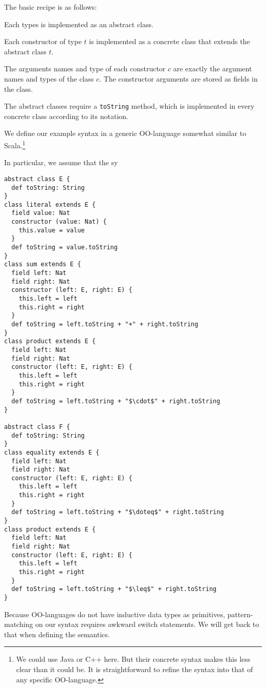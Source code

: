 The basic recipe is as follows:
\begin{compactitem}
\item Each types is implemented as an abstract class.
\item Each constructor of type $t$ is implemented as a concrete class that extends the abstract class $t$.
\item The arguments names and type of each constructor $c$ are exactly the argument names and types of the class $c$.
The constructor arguments are stored as fields in the class.
\item The abstract classes require a \texttt{toString} method, which is implemented in every concrete class according to its notation.
\end{compactitem}


\begin{example}
We define our example syntax in a generic OO-language somewhat similar to Scala.\footnote{We could use Java or C++ here. But their concrete syntax makes this less clear than it could be. It is straightforward to refine the syntax into that of any specific OO-language.}

In particular, we assume that the sy

\begin{lstlisting}
abstract class E {
  def toString: String
}
class literal extends E {
  field value: Nat
  constructor (value: Nat) {
    this.value = value
  }
  def toString = value.toString
}
class sum extends E {
  field left: Nat
  field right: Nat
  constructor (left: E, right: E) {
    this.left = left
    this.right = right
  }
  def toString = left.toString + "+" + right.toString
}
class product extends E {
  field left: Nat
  field right: Nat
  constructor (left: E, right: E) {
    this.left = left
    this.right = right
  }
  def toString = left.toString + "$\cdot$" + right.toString
}

abstract class F {
  def toString: String
}
class equality extends E {
  field left: Nat
  field right: Nat
  constructor (left: E, right: E) {
    this.left = left
    this.right = right
  }
  def toString = left.toString + "$\doteq$" + right.toString
}
class product extends E {
  field left: Nat
  field right: Nat
  constructor (left: E, right: E) {
    this.left = left
    this.right = right
  }
  def toString = left.toString + "$\leq$" + right.toString
}
\end{lstlisting}
\end{example}

Because OO-languages do not have inductive data types as primitives, pattern-matching on our syntax requires awkward switch statements.
We will get back to that when defining the semantics.

